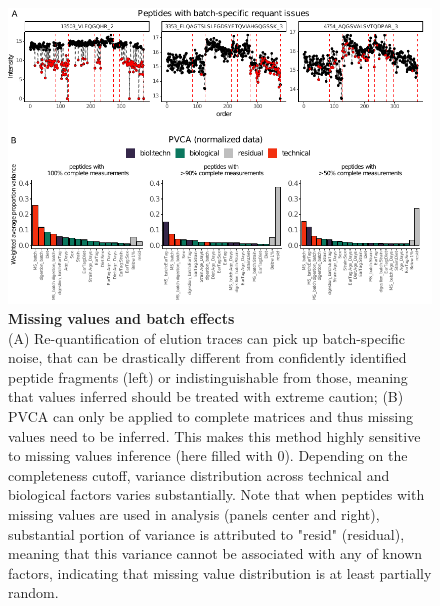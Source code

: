\documentclass[num-refs]{wiley-article}
\begin{document}
\begin{figure}
	\includegraphics[width=\textwidth]{figures/Supp_Fig4_missing_values_extra.pdf}
	
	\caption{\textbf{Missing values and batch effects} \\
		\footnotesize (A) Re-quantification of elution traces can pick up batch-specific noise, that can be drastically different from confidently identified peptide fragments (left) or indistinguishable from those, meaning that values inferred should be treated with extreme caution; (B) PVCA can only be applied to complete matrices and thus missing values need to be inferred. This makes this method highly sensitive to missing values inference (here filled with 0). Depending on the completeness cutoff, variance distribution across technical and biological factors varies substantially. Note that when peptides with missing values are used in analysis (panels center and right), substantial portion of variance is attributed to "resid" (residual), meaning that this variance cannot be associated with any of known factors, indicating that missing value distribution is at least partially random.}
	\label{fig:batch_figS4_missing_values}
\end{figure}
\end{document}
